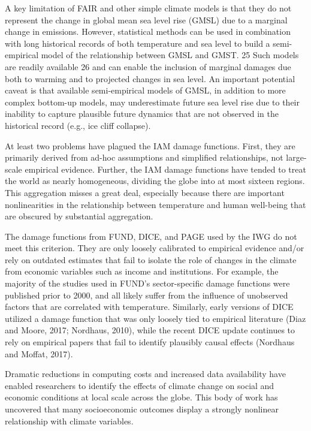 \documentclass[
]{book}
\begin{document}
A key limitation of FAIR and other simple climate models is that they do not represent
the change in global mean sea level rise (GMSL) due to a marginal change in emissions.
However, statistical methods can be used in combination with long historical records of
both temperature and sea level to build a semi-empirical model of the relationship
between GMSL and GMST. 25 Such models are readily available 26 and can enable the
inclusion of marginal damages due both to warming and to projected changes in sea
level. An important potential caveat is that available semi-empirical models of GMSL,
in addition to more complex bottom-up models, may underestimate future sea level rise
due to their inability to capture plausible future dynamics that are not observed in the
historical record (e.g., ice cliff collapse).

At least two problems have plagued the IAM damage functions. First, they are
primarily derived from ad-hoc assumptions and simplified relationships, not large-scale
empirical evidence. Further, the IAM damage functions have tended to treat the world
as nearly homogeneous, dividing the globe into at most sixteen regions. This aggregation
misses a great deal, especially because there are important nonlinearities in the
relationship between temperature and human well-being that are obscured by
substantial aggregation.

The damage functions from FUND, DICE, and PAGE used by the IWG do not
meet this criterion. They are only loosely calibrated to empirical evidence and/or
rely on outdated estimates that fail to isolate the role of changes in the climate
from economic variables such as income and institutions. For example, the
majority of the studies used in FUND's sector-specific damage functions were
published prior to 2000, and all likely suffer from the influence of unobserved
factors that are correlated with temperature. Similarly, early versions of DICE
utilized a damage function that was only loosely tied to empirical literature (Diaz
and Moore, 2017; Nordhaus, 2010), while the recent DICE update continues to
rely on empirical papers that fail to identify plausibly causal effects (Nordhaus
and Moffat, 2017).

Dramatic reductions in computing costs and increased data availability have
enabled researchers to identify the effects of climate change on social and
economic conditions at local scale across the globe. This body of work has
uncovered that many socioeconomic outcomes display a strongly nonlinear
relationship with climate variables.
\end{document}
